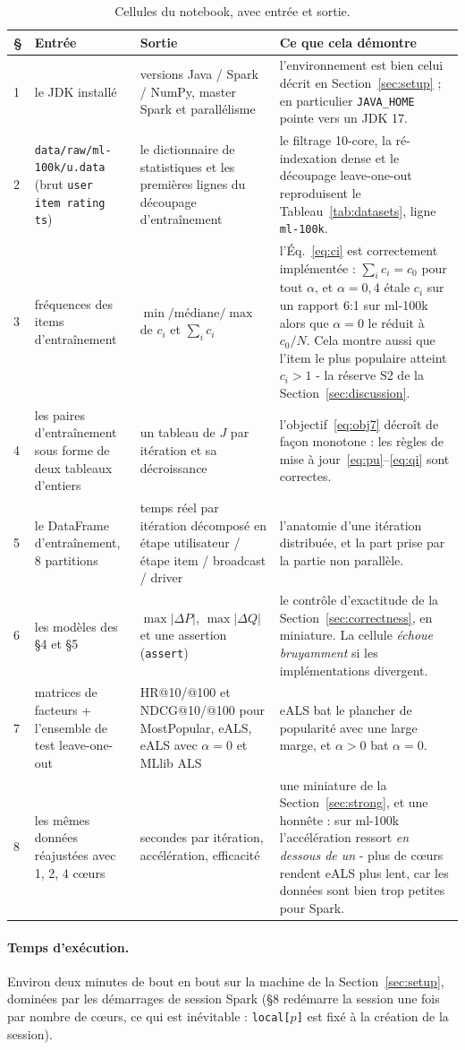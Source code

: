 \begin{table}[h]
\centering\small
\caption{Cellules du notebook, avec entrée et sortie.}\label{tab:nb}
\begin{tabular}{@{}p{0.5cm}p{4.6cm}p{4.6cm}p{5.2cm}@{}}
\toprule
\S & Entrée & Sortie & Ce que cela démontre \\
\midrule
1 & le JDK installé & versions Java / Spark / NumPy, master Spark et parallélisme
  & l'environnement est bien celui décrit en Section~\ref{sec:setup} ; en particulier
    \texttt{JAVA\_HOME} pointe vers un JDK 17. \\
2 & \texttt{data/raw/ml-100k/u.data} (brut \texttt{user\,item\,rating\,ts}) & le
    dictionnaire de statistiques et les premières lignes du découpage d'entraînement
    & le filtrage 10-core, la ré-indexation dense et le découpage leave-one-out
    reproduisent le Tableau~\ref{tab:datasets}, ligne \texttt{ml-100k}. \\
3 & fréquences des items d'entraînement & $\min/\text{médiane}/\max$ de $c_i$ et
    $\sum_i c_i$ & l'Éq.~\eqref{eq:ci} est correctement implémentée :
    $\sum_i c_i=c_0$ pour tout $\alpha$, et $\alpha=0,4$ étale $c_i$ sur un rapport
    6:1 sur ml-100k alors que $\alpha=0$ le réduit à $c_0/N$. Cela montre aussi que
    l'item le plus populaire atteint $c_i>1$ - la réserve S2 de la
    Section~\ref{sec:discussion}. \\
4 & les paires d'entraînement sous forme de deux tableaux d'entiers & un tableau de
    $J$ par itération et sa décroissance & l'objectif~\eqref{eq:obj7} décroît de
    façon monotone : les règles de mise à jour~\eqref{eq:pu}--\eqref{eq:qi} sont
    correctes. \\
5 & le DataFrame d'entraînement, 8 partitions & temps réel par itération décomposé en
    étape utilisateur / étape item / broadcast / driver & l'anatomie d'une itération
    distribuée, et la part prise par la partie non parallèle. \\
6 & les modèles des \S4 et \S5 & $\max|\Delta P|$, $\max|\Delta Q|$ et une assertion
    (\texttt{assert}) & le contrôle d'exactitude de la
    Section~\ref{sec:correctness}, en miniature. La cellule \emph{échoue
    bruyamment} si les implémentations divergent. \\
7 & matrices de facteurs + l'ensemble de test leave-one-out & HR@10/@100 et
    NDCG@10/@100 pour MostPopular, eALS, eALS avec $\alpha=0$ et MLlib ALS & eALS bat
    le plancher de popularité avec une large marge, et $\alpha>0$ bat $\alpha=0$. \\
8 & les mêmes données réajustées avec 1, 2, 4 cœurs & secondes par itération,
    accélération, efficacité & une miniature de la Section~\ref{sec:strong}, et une
    honnête : sur ml-100k l'accélération ressort \emph{en dessous de un} - plus de
    cœurs rendent eALS plus lent, car les données sont bien trop petites pour Spark. \\
\bottomrule
\end{tabular}
\end{table}

\paragraph{Temps d'exécution.} Environ deux minutes de bout en bout sur la machine
de la Section~\ref{sec:setup}, dominées par les démarrages de session Spark
(\S8 redémarre la session une fois par nombre de cœurs, ce qui est inévitable :
\texttt{local[$p$]} est fixé à la création de la session).
